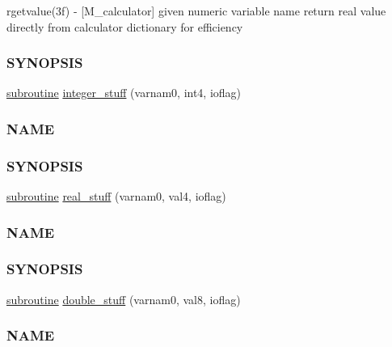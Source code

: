 \begin{DoxyCompactItemize}
\begin{DoxyCompactList}
rgetvalue(3f) -\/ \mbox{[}M\+\_\+calculator\mbox{]} given numeric variable name return real value directly from calculator dictionary for efficiency \subsubsection*{S\+Y\+N\+O\+P\+S\+IS}\end{DoxyCompactList}\item 
\hyperlink{M__stopwatch_83_8txt_acfbcff50169d691ff02d4a123ed70482}{subroutine} \hyperlink{namespacem__calculator_ae760c3bf7e4e933427bad6c92cd16dfb}{integer\+\_\+stuff} (varnam0, int4, ioflag)
\begin{DoxyCompactList}\small\item\em \subsubsection*{N\+A\+ME}

\subsubsection*{S\+Y\+N\+O\+P\+S\+IS}\end{DoxyCompactList}\item 
\hyperlink{M__stopwatch_83_8txt_acfbcff50169d691ff02d4a123ed70482}{subroutine} \hyperlink{namespacem__calculator_a8337bfb59665d3236fed48d316e3701b}{real\+\_\+stuff} (varnam0, val4, ioflag)
\begin{DoxyCompactList}\small\item\em \subsubsection*{N\+A\+ME}

\subsubsection*{S\+Y\+N\+O\+P\+S\+IS}\end{DoxyCompactList}\item 
\hyperlink{M__stopwatch_83_8txt_acfbcff50169d691ff02d4a123ed70482}{subroutine} \hyperlink{namespacem__calculator_ab70b7eb8f684537155298c061b54c356}{double\+\_\+stuff} (varnam0, val8, ioflag)
\begin{DoxyCompactList}\small\item\em \subsubsection*{N\+A\+ME}


\end{DoxyCompactList}
\end{DoxyCompactItemize}
